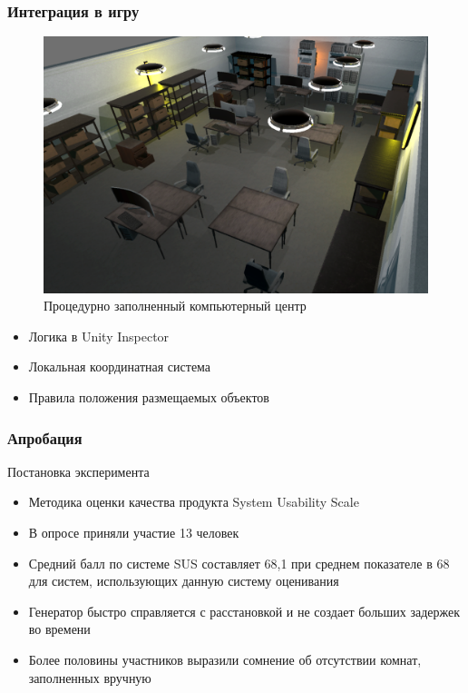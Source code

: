 \documentclass{beamer}
\begin{document}
\begin{frame}
  \frametitle{Интеграция в игру}
  \begin{minipage}[m]{0.6\linewidth}
    \begin{figure}
      \centering
        \includegraphics[width=\textwidth]{pictures/computing_center.png}
        \caption{Процедурно заполненный компьютерный центр}
    \end{figure}
    \end{minipage}\hfill
    \begin{minipage}[m]{0.4\linewidth}
      \begin{itemize}
        \item Логика в Unity Inspector
        \item Локальная координатная система
        \item Правила положения размещаемых объектов
      \end{itemize}
    \end{minipage}
\end{frame}

\begin{frame}[t]
  \frametitle{Апробация}
  Постановка эксперимента
  \begin{itemize}
    \item Методика оценки качества продукта System Usability Scale
    \item В опросе приняли участие 13 человек  
    \item Средний балл по системе SUS составляет 68,1 при среднем показателе в 68 для систем, использующих данную систему оценивания
    \item Генератор быстро справляется с расстановкой и не создает больших задержек во времени
    \item Более половины участников выразили сомнение об отсутствии комнат, заполненных вручную
  \end{itemize}  
\end{frame}
\end{document}
